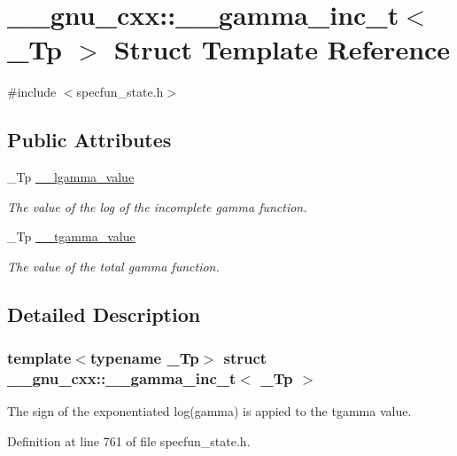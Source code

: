 \hypertarget{struct____gnu__cxx_1_1____gamma__inc__t}{}\section{\+\_\+\+\_\+gnu\+\_\+cxx\+:\+:\+\_\+\+\_\+gamma\+\_\+inc\+\_\+t$<$ \+\_\+\+Tp $>$ Struct Template Reference}
\label{struct____gnu__cxx_1_1____gamma__inc__t}


{\ttfamily \#include $<$specfun\+\_\+state.\+h$>$}

\subsection*{Public Attributes}
\begin{DoxyCompactItemize}
\item 
\+\_\+\+Tp \hyperlink{struct____gnu__cxx_1_1____gamma__inc__t_a193b3f7871e371363571fe90b1ce1767}{\+\_\+\+\_\+lgamma\+\_\+value}
\begin{DoxyCompactList}\small\item\em The value of the log of the incomplete gamma function. \end{DoxyCompactList}\item 
\+\_\+\+Tp \hyperlink{struct____gnu__cxx_1_1____gamma__inc__t_a53d4ffc984c6685ce328caff424b5fe4}{\+\_\+\+\_\+tgamma\+\_\+value}
\begin{DoxyCompactList}\small\item\em The value of the total gamma function. \end{DoxyCompactList}\end{DoxyCompactItemize}


\subsection{Detailed Description}
\subsubsection*{template$<$typename \+\_\+\+Tp$>$\newline
struct \+\_\+\+\_\+gnu\+\_\+cxx\+::\+\_\+\+\_\+gamma\+\_\+inc\+\_\+t$<$ \+\_\+\+Tp $>$}

The sign of the exponentiated log(gamma) is appied to the tgamma value. 

Definition at line 761 of file specfun\+\_\+state.\+h.



